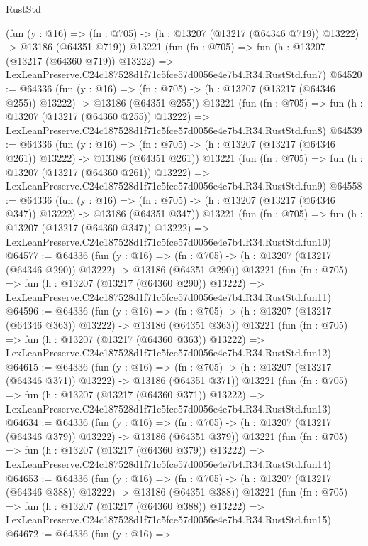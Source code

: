 \begin{lexlean}{RustStd}
\begin{coremodule}
    (fun (y : @16) =>
    (fn : @705) -> (h : @13207 (@13217 (@64346 @719)) @13222) -> @13186 (@64351 @719))
    @13221
    (fun (fn : @705) =>
    fun (h : @13207 (@13217 (@64360 @719)) @13222) =>
    LexLeanPreserve.C24c187528d1f71c5fce57d0056e4e7b4.R34.RustStd.fun7)
@64520 := @64336
    (fun (y : @16) =>
    (fn : @705) -> (h : @13207 (@13217 (@64346 @255)) @13222) -> @13186 (@64351 @255))
    @13221
    (fun (fn : @705) =>
    fun (h : @13207 (@13217 (@64360 @255)) @13222) =>
    LexLeanPreserve.C24c187528d1f71c5fce57d0056e4e7b4.R34.RustStd.fun8)
@64539 := @64336
    (fun (y : @16) =>
    (fn : @705) -> (h : @13207 (@13217 (@64346 @261)) @13222) -> @13186 (@64351 @261))
    @13221
    (fun (fn : @705) =>
    fun (h : @13207 (@13217 (@64360 @261)) @13222) =>
    LexLeanPreserve.C24c187528d1f71c5fce57d0056e4e7b4.R34.RustStd.fun9)
@64558 := @64336
    (fun (y : @16) =>
    (fn : @705) -> (h : @13207 (@13217 (@64346 @347)) @13222) -> @13186 (@64351 @347))
    @13221
    (fun (fn : @705) =>
    fun (h : @13207 (@13217 (@64360 @347)) @13222) =>
    LexLeanPreserve.C24c187528d1f71c5fce57d0056e4e7b4.R34.RustStd.fun10)
@64577 := @64336
    (fun (y : @16) =>
    (fn : @705) -> (h : @13207 (@13217 (@64346 @290)) @13222) -> @13186 (@64351 @290))
    @13221
    (fun (fn : @705) =>
    fun (h : @13207 (@13217 (@64360 @290)) @13222) =>
    LexLeanPreserve.C24c187528d1f71c5fce57d0056e4e7b4.R34.RustStd.fun11)
@64596 := @64336
    (fun (y : @16) =>
    (fn : @705) -> (h : @13207 (@13217 (@64346 @363)) @13222) -> @13186 (@64351 @363))
    @13221
    (fun (fn : @705) =>
    fun (h : @13207 (@13217 (@64360 @363)) @13222) =>
    LexLeanPreserve.C24c187528d1f71c5fce57d0056e4e7b4.R34.RustStd.fun12)
@64615 := @64336
    (fun (y : @16) =>
    (fn : @705) -> (h : @13207 (@13217 (@64346 @371)) @13222) -> @13186 (@64351 @371))
    @13221
    (fun (fn : @705) =>
    fun (h : @13207 (@13217 (@64360 @371)) @13222) =>
    LexLeanPreserve.C24c187528d1f71c5fce57d0056e4e7b4.R34.RustStd.fun13)
@64634 := @64336
    (fun (y : @16) =>
    (fn : @705) -> (h : @13207 (@13217 (@64346 @379)) @13222) -> @13186 (@64351 @379))
    @13221
    (fun (fn : @705) =>
    fun (h : @13207 (@13217 (@64360 @379)) @13222) =>
    LexLeanPreserve.C24c187528d1f71c5fce57d0056e4e7b4.R34.RustStd.fun14)
@64653 := @64336
    (fun (y : @16) =>
    (fn : @705) -> (h : @13207 (@13217 (@64346 @388)) @13222) -> @13186 (@64351 @388))
    @13221
    (fun (fn : @705) =>
    fun (h : @13207 (@13217 (@64360 @388)) @13222) =>
    LexLeanPreserve.C24c187528d1f71c5fce57d0056e4e7b4.R34.RustStd.fun15)
@64672 := @64336
    (fun (y : @16) =>

\end{coremodule}
\end{lexlean}
